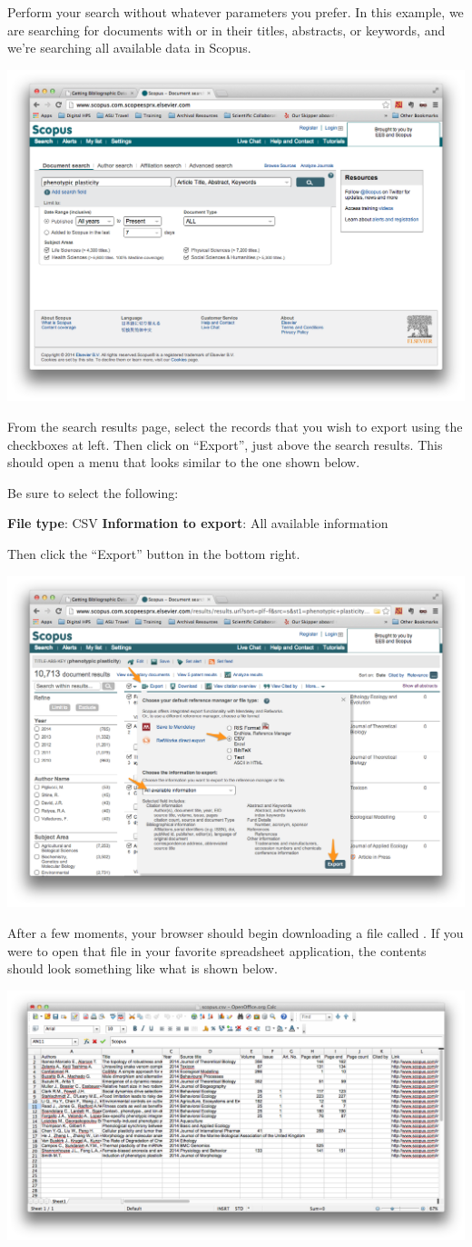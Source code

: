 \documentclass[letterpaper,10pt,english]{sphinxmanual}
\begin{document}
Perform your search without whatever parameters you prefer. In this example, we are
searching for documents with  or  in their titles, abstracts,
or keywords, and we're searching all available data in Scopus.

\includegraphics[width=0.600\linewidth]{getting.9.png}

From the search results page, select the records that you wish to export using the
checkboxes at left. Then click on ``Export'', just above the search results. This should
open a menu that looks similar to the one shown below.

Be sure to select the following:

\textbf{File type}: CSV
\textbf{Information to export}: All available information

Then click the ``Export'' button in the bottom right.

\includegraphics[width=0.600\linewidth]{getting.10.png}

After a few moments, your browser should begin downloading a file called .
If you were to open that file in your favorite spreadsheet application, the contents
should look something like what is shown below.

\includegraphics[width=0.600\linewidth]{getting.11.png}
\end{document}
